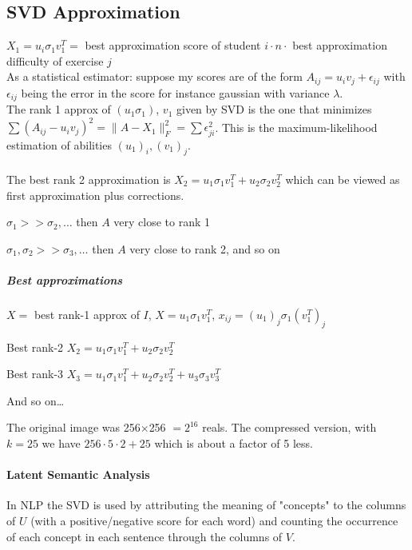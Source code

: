 \documentclass[10pt]{report}
\begin{document}
\subsection{SVD Approximation} $X_1 = u_i\sigma_1 v_1^T =$ best approximation score of student $i \cdot n \cdot$ best approximation difficulty of exercise $j$\\
As a statistical estimator: suppose my scores are of the form $A_{ij} = u_i v_j + \epsilon_{ij}$ with $\epsilon_{ij}$ being the error in the score for instance gaussian with variance $\lambda$.\\
The rank 1 approx of $(u_1\sigma_1)$, $v_1$ given by SVD is the one that minimizes $\sum (A_{ij} - u_iv_j)^2 = \|A-X_1\|_F^2 = \sum \epsilon_{ji}^2$. This is the maximum-likelihood estimation of abilities $(u_1)_i, (v_1)_j$.\\\\
The best rank 2 approximation is $X_2 = u_1\sigma_1 v_1^T + u_2\sigma_2 v_2^T$ which can be viewed as first approximation plus corrections.
\begin{list}{}{}
	\item $\sigma_1 >> \sigma_2,\ldots$ then $A$ very close to rank 1
	\item $\sigma_1, \sigma_2 >> \sigma_3,\ldots$ then $A$ very close to rank 2, and so on
\end{list}
\subparagraph{Best approximations} 
\begin{list}{}{}
	\item $X =$ best rank-1 approx of $I$, $X = u_1\sigma_1 v_1^T$, $x_{ij} = (u_1)_j \sigma_1 (v_1^T)_j$
	\item Best rank-2 $X_2 = u_1\sigma_1 v_1^T + u_2 \sigma_2 v_2^T$
	\item Best rank-3 $X_3 = u_1\sigma_1 v_1^T + u_2 \sigma_2 v_2^T + u_3 \sigma_3 v_3^T$
	\item And so on\ldots
\end{list}
The original image was 256$\times$256 $= 2^{16}$ reals. The compressed version, with $k = 25$ we have $256\cdot5\cdot2 + 25$ which is about a factor of 5 less.
\paragraph{Latent Semantic Analysis} In NLP the SVD is used by attributing the meaning of "concepts" to the columns of $U$ (with a positive/negative score for each word) and counting the occurrence of each concept in each sentence through the columns of $V$.
\end{document}
